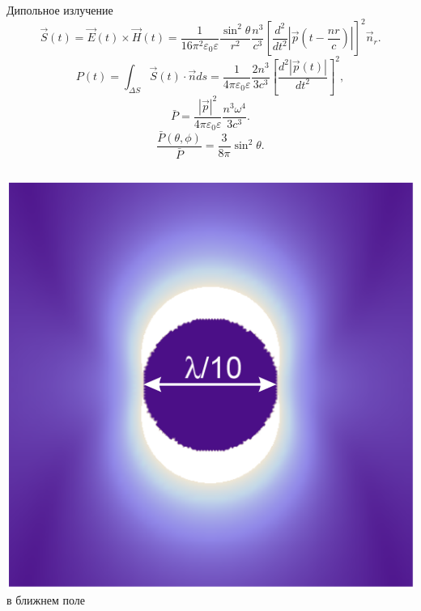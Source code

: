 \documentclass[9pt, compress, xcolor=table]{beamer}
\begin{document}
\begin{frame}{Дипольное излучение}
\begin{equation*}
\label{eq_8.69}
\vec S(t)=\vec E(t)\times\vec H(t)=\frac{1}{16\pi^2\varepsilon_0\varepsilon}\frac{\sin^2{\theta}}{r^2}\frac{n^3}{c^3}\left[\dfrac{d^2}{dt^2}\left|\vec p\left(t-\frac{nr}{c}\right)\right|\right]^2\vec n_r.
\end{equation*}
\smallskip
\begin{equation*}
\label{eq_8.70}
P(t)=\int_{\Delta S}\vec S(t)\cdot\vec nds=\frac{1}{4\pi\varepsilon_0\varepsilon}\frac{2n^3}{3c^3}\left[\dfrac{d^2|\vec p(t)|}{dt^2}\right]^2,
\end{equation*}
\smallskip
\begin{equation*}
\label{eq_8.71}
\bar P=\frac{|\vec p|^2}{4\pi\varepsilon_0\varepsilon}\frac{n^3\omega^4}{3c^3}.
\end{equation*}
\smallskip
\begin{equation*}
\label{eq_8.72}
\frac{\bar P(\theta, \phi)}{\bar P}=\frac{3}{8\pi}\sin^2{\theta}.
\end{equation*}


\begin{columns}[c]

\column{4cm}

\centering
\includegraphics[width=0.9 \textwidth]{near}
\\\scriptsize{в ближнем поле}



\end{columns}
\end{frame}
\end{document}
